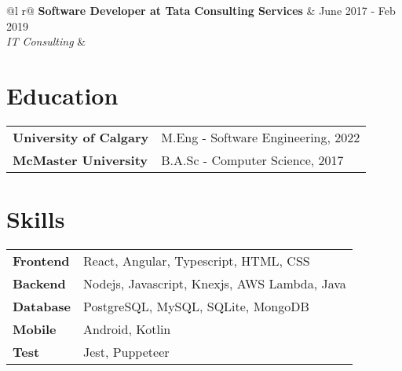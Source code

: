 \documentclass[a4paper,12pt]{article}
\begin{document}
\begin{tabularx}{\linewidth}{ @{}l r@{} }
\textbf{Software Developer at Tata Consulting Services} & \hfill June 2017 - Feb 2019 \\[3.75pt]
\textsl{IT Consulting}  & \hfill \\[3.75pt]
\end{tabularx}

\section{\large{Education}}
\begin{tabularx}{\linewidth}{@{}l X@{}}	
\textbf{University of Calgary} & M.Eng - Software Engineering, 2022 \\
\textbf{McMaster University} & B.A.Sc - Computer Science, 2017 \\

\end{tabularx}

\section{\large{Skills}}
\begin{tabularx}{\linewidth}{@{}l X@{}}
\textbf{Frontend} & \normalsize{React, Angular, Typescript, HTML, CSS }\\
\textbf{Backend}  &  \normalsize{Nodejs, Javascript, Knexjs, AWS Lambda, Java}\\  
\textbf{Database}  &  \normalsize{PostgreSQL, MySQL, SQLite, MongoDB}\\
\textbf{Mobile}  &  \normalsize{Android, Kotlin}\\  
\textbf{Test}  &  \normalsize{Jest, Puppeteer}\\
\end{tabularx}
\end{document}
